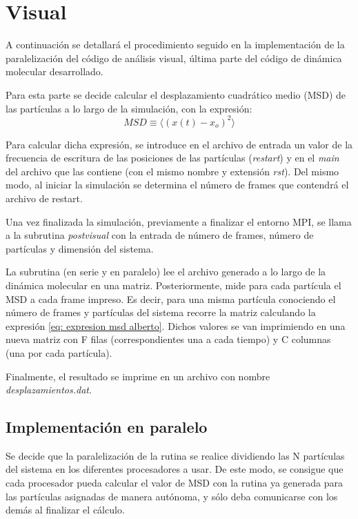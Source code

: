 \documentclass[onecolumn]{article}
\renewcommand{\it}[1]{\textit{#1}}
\begin{document}
\lipsum

\section{Visual}

A continuación se detallará el procedimiento seguido en la implementación de la paralelización del código de análisis visual, última parte del código de dinámica molecular desarrollado.

Para esta parte se decide calcular el desplazamiento cuadrático medio (MSD) de las partículas a lo largo de la simulación, con la expresión:
\begin{equation}\label{eq: expresion msd alberto}
MSD \equiv \langle\left(x(t)-x_{o}\right)^{2}\rangle
\end{equation}

Para calcular dicha expresión, se introduce en el archivo de entrada un valor de la frecuencia de escritura de las posiciones de las partículas (\it{restart}) y en el  \it{main} del archivo que las contiene (con el mismo nombre y extensión \it{rst}). Del mismo modo, al iniciar la simulación se determina el número de frames que contendrá el archivo de restart.

Una vez finalizada la simulación, previamente a finalizar el entorno MPI, se llama a la subrutina \it{postvisual} con la entrada de número de frames, número de partículas y dimensión del sistema.

La subrutina (en serie y en paralelo) lee el archivo generado a lo largo de la dinámica molecular en una matriz. Posteriormente, mide para cada partícula el MSD a cada frame impreso. Es decir, para una misma partícula conociendo el número de frames y partículas del sistema recorre la matriz calculando la expresión \eqref{eq: expresion msd alberto}. Dichos valores se van imprimiendo en una nueva matriz con F filas (correspondientes una a cada tiempo) y C columnas (una por cada partícula).

Finalmente, el resultado se imprime en un archivo con nombre \it{desplazamientos.dat}.

\subsection{Implementación en paralelo}
Se decide que la paralelización de la rutina se realice dividiendo las N partículas del sistema en los diferentes procesadores a usar. De este modo, se consigue que cada procesador pueda calcular el valor de MSD con la rutina ya generada para las partículas asignadas de manera autónoma, y sólo deba comunicarse con los demás al finalizar el cálculo.
\end{document}
